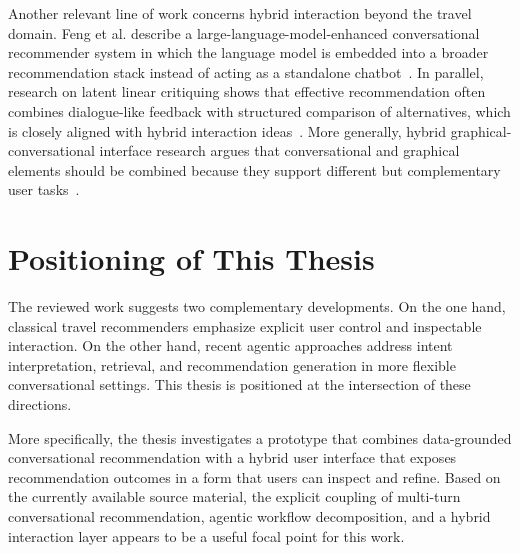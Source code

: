 Another relevant line of work concerns hybrid interaction beyond the travel domain. Feng et al. describe a large-language-model-enhanced conversational recommender system in which the language model is embedded into a broader recommendation stack instead of acting as a standalone chatbot~\parencite{fengLLMEnhancedCRS}. In parallel, research on latent linear critiquing shows that effective recommendation often combines dialogue-like feedback with structured comparison of alternatives, which is closely aligned with hybrid interaction ideas~\parencite{liLatentLinearCritiquing}. More generally, hybrid graphical-conversational interface research argues that conversational and graphical elements should be combined because they support different but complementary user tasks~\parencite{jarvinenPromptingFuture}.

\section{Positioning of This Thesis}\label{section:related-work:positioning}
The reviewed work suggests two complementary developments. On the one hand, classical travel recommenders emphasize explicit user control and inspectable interaction. On the other hand, recent agentic approaches address intent interpretation, retrieval, and recommendation generation in more flexible conversational settings. This thesis is positioned at the intersection of these directions.

More specifically, the thesis investigates a prototype that combines data-grounded conversational recommendation with a hybrid user interface that exposes recommendation outcomes in a form that users can inspect and refine. Based on the currently available source material, the explicit coupling of multi-turn conversational recommendation, agentic workflow decomposition, and a hybrid interaction layer appears to be a useful focal point for this work. %
